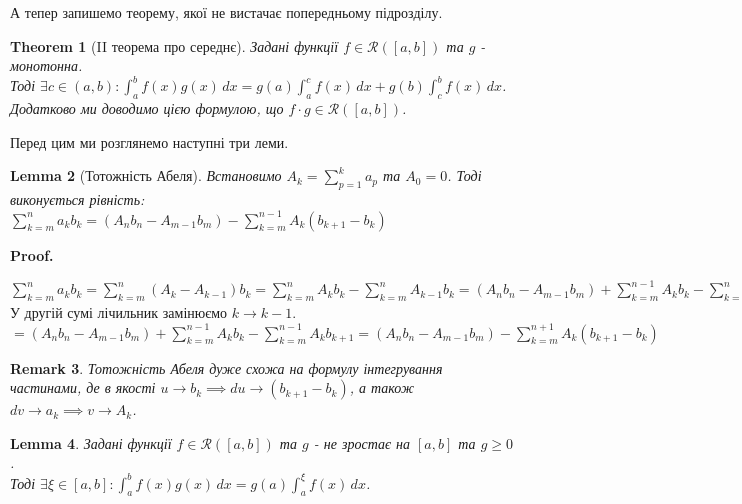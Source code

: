 \documentclass[a4paper, 10pt]{article}
\makeatletter
\def\huge{\displaystyle}
\def\qed{$\blacksquare$}
\theoremstyle{theoremdd}
\newtheorem{theorem}{Theorem}[subsection]
\theoremstyle{theoremdd}
\theoremstyle{theoremdd}
\theoremstyle{theoremdd}
\theoremstyle{theoremdd}
\theoremstyle{theoremdd}
\theoremstyle{theoremdd}
\newtheorem{remark}[theorem]{Remark}
\theoremstyle{theoremdd}
\newtheorem{lemma}[theorem]{Lemma}
\theoremstyle{theoremdd}
\renewenvironment{proof}[1][Proof.\\]{\par
\pushQED{\hfill \qed}%
\normalfont \topsep6\p@\@plus6\p@\relax
\trivlist
\item\relax
{\bfseries
#1\@addpunct{.}}\hspace\labelsep\ignorespaces
}{%
\popQED\endtrivlist\@endpefalse
}
\makeatother
\begin{document}
А тепер запишемо теорему, якої не вистачає попередньому підрозділу.
\begin{theorem}[II теорема про середнє]
Задані функції $f\in \mathcal{R}([a,b])$ та $g$ - монотонна. \\
Тоді $\exists c \in (a,b): \huge\int_a^b f(x)g(x)\,dx = g(a)\int_a^c f(x)\,dx + g(b) \int_c^b f(x)\,dx$.\\
Додатково ми доводимо цією формулою, що $f \cdot g \in \mathcal{R}([a,b])$.
\end{theorem}

Перед цим ми розглянемо наступні три леми.
\begin{lemma}[Тотожність Абеля]
Встановимо $A_k = \huge\sum_{p=1}^k a_p$ та $A_0 = 0$. Тоді виконується рівність:\\
$\huge\sum_{k=m}^n a_k b_k = \left(A_n b_n - A_{m-1} b_m \right) - \huge\sum_{k=m}^{n-1} A_k(b_{k+1}-b_{k})$
\end{lemma}

\begin{proof}
$\huge\sum_{k=m}^n a_k b_k = \sum_{k=m}^n (A_k-A_{k-1})b_k = \sum_{k=m}^n A_k b_k - \sum_{k=m}^n A_{k-1}b_k = (A_nb_n - A_{m-1}b_m) + \sum_{k=m}^{n-1} A_k b_k - \sum_{k=m+1}^n A_{k-1}b_k \boxed{=}$\\
У другій сумі лічильник замінюємо $k \to k-1$.\\
$\boxed{=} \huge (A_nb_n - A_{m-1}b_m) + \sum_{k=m}^{n-1} A_k b_k - \sum_{k=m}^{n-1} A_{k}b_{k+1} = (A_nb_n - A_{m-1}b_m) - \sum_{k=m}^{n+1} A_k (b_{k+1}-b_k)$
\end{proof}

\begin{remark}
Тотожність Абеля дуже схожа на формулу інтегрування частинами, де в якості $u \to b_k \implies du \to (b_{k+1}-b_k)$, а також $dv \to a_k \implies v \to A_k$.
\end{remark}

\begin{lemma}
Задані функції $f \in \mathcal{R}([a,b])$ та $g$ - не зростає на $[a,b]$ та $g \geq 0$. \\
Тоді $\exists \xi \in [a,b]: \huge\int_a^b f(x)g(x)\,dx = g(a) \int_a^\xi f(x)\,dx$.
\end{lemma}
\end{document}
